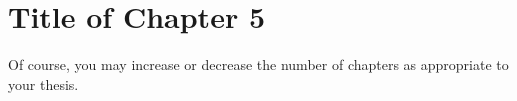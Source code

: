 \chapter{Title of Chapter 5}

Of course, you may increase or decrease the number of chapters as appropriate to your thesis.
